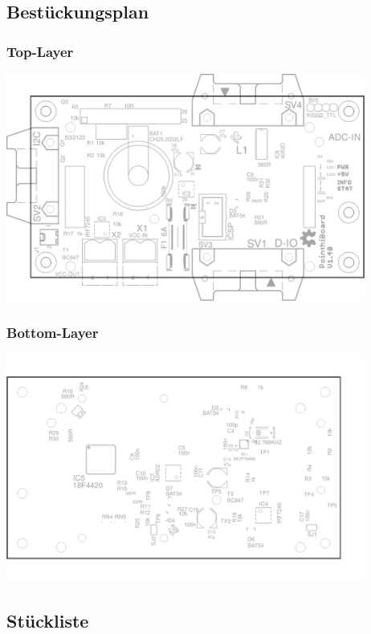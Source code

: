 \documentclass[a4paper,10pt]{article}
\begin{document}
\subsection{Bestückungsplan}

\subsubsection{Top-Layer}

\includegraphics[width=118mm]{board_parts_top} \\

\subsubsection{Bottom-Layer}

\includegraphics[width=118mm]{board_parts_bottom} \\

\newpage
\subsection{Stückliste}
\end{document}
